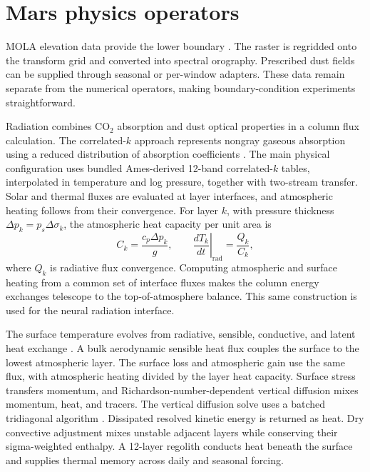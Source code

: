 \documentclass{article} %
\newcommand{\co}{CO$_2$}
\begin{document}





\appendix
\section{Mars physics operators}\label{app:physics}

MOLA elevation data provide the lower boundary \citep{smith2001,mola}. The raster is regridded onto the transform grid and converted into spectral orography. Prescribed dust fields can be supplied through seasonal or per-window adapters. These data remain separate from the numerical operators, making boundary-condition experiments straightforward.

Radiation combines \co{} absorption and dust optical properties in a column flux calculation. The correlated-$k$ approach represents nongray gaseous absorption using a reduced distribution of absorption coefficients \citep{lacis1991}. The main physical configuration uses bundled Ames-derived 12-band correlated-$k$ tables, interpolated in temperature and log pressure, together with two-stream transfer. Solar and thermal fluxes are evaluated at layer interfaces, and atmospheric heating follows from their convergence. For layer $k$, with pressure thickness $\Delta p_k=p_s\Delta\sigma_k$, the atmospheric heat capacity per unit area is
\begin{equation}
 C_k=\frac{c_p\Delta p_k}{g},\qquad
 \left.\frac{dT_k}{dt}\right|_{\mathrm{rad}}=\frac{Q_k}{C_k},
\end{equation}
where $Q_k$ is radiative flux convergence. Computing atmospheric and surface heating from a common set of interface fluxes makes the column energy exchanges telescope to the top-of-atmosphere balance. This same construction is used for the neural radiation interface.

The surface temperature evolves from radiative, sensible, conductive, and latent heat exchange \citep{forget1999improved,haberle2019ames}. A bulk aerodynamic sensible heat flux couples the surface to the lowest atmospheric layer. The surface loss and atmospheric gain use the same flux, with atmospheric heating divided by the layer heat capacity. Surface stress transfers momentum, and Richardson-number-dependent vertical diffusion mixes momentum, heat, and tracers. The vertical diffusion solve uses a batched tridiagonal algorithm \citep{petrosyan2011pbl}. Dissipated resolved kinetic energy is returned as heat. Dry convective adjustment mixes unstable adjacent layers while conserving their sigma-weighted enthalpy. A 12-layer regolith conducts heat beneath the surface and supplies thermal memory across daily and seasonal forcing.
\end{document}
